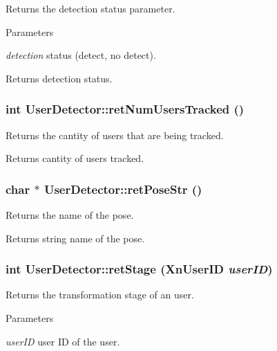 \label{classUserDetector_ac7b298a32601799b1750e8d5d72067fa}
Returns the detection status parameter. 
\begin{DoxyParams}{Parameters}
\item[{\em detection}]status (detect, no detect). \end{DoxyParams}
\begin{DoxyReturn}{Returns}
detection status. 
\end{DoxyReturn}
\hypertarget{classUserDetector_a5cdce696a8c4064b34e1f7159921789f}{
\subsubsection[{retNumUsersTracked}]{\setlength{\rightskip}{0pt plus 5cm}int UserDetector::retNumUsersTracked ()}}
\label{classUserDetector_a5cdce696a8c4064b34e1f7159921789f}
Returns the cantity of users that are being tracked. \begin{DoxyReturn}{Returns}
cantity of users tracked. 
\end{DoxyReturn}
\hypertarget{classUserDetector_a4119f90fe93f3803fe1daa083cc33a6b}{
\subsubsection[{retPoseStr}]{\setlength{\rightskip}{0pt plus 5cm}char $\ast$ UserDetector::retPoseStr ()}}
\label{classUserDetector_a4119f90fe93f3803fe1daa083cc33a6b}
Returns the name of the pose. \begin{DoxyReturn}{Returns}
string name of the pose. 
\end{DoxyReturn}
\hypertarget{classUserDetector_abea25041679657598dcb9db7d9b9a9ec}{
\subsubsection[{retStage}]{\setlength{\rightskip}{0pt plus 5cm}int UserDetector::retStage (XnUserID {\em userID})}}
\label{classUserDetector_abea25041679657598dcb9db7d9b9a9ec}
Returns the transformation stage of an user. 
\begin{DoxyParams}{Parameters}
\item[{\em userID}]user ID of the user. \end{DoxyParams}
